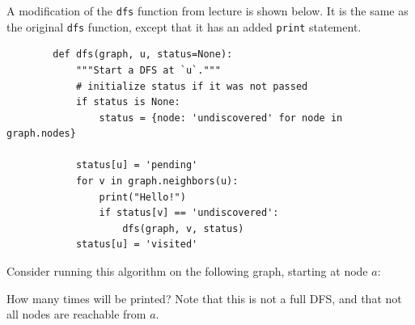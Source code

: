 \Needspace{6.5in}

\begin{prob}

    A modification of the \texttt{dfs} function from lecture is shown below.
    It is the same as the original \texttt{dfs} function, except that it has
    an added \texttt{print} statement.

    \begin{verbatim}
        def dfs(graph, u, status=None):
            """Start a DFS at `u`."""
            # initialize status if it was not passed
            if status is None:
                status = {node: 'undiscovered' for node in graph.nodes}

            status[u] = 'pending'
            for v in graph.neighbors(u):
                print("Hello!")
                if status[v] == 'undiscovered':
                    dfs(graph, v, status)
            status[u] = 'visited'
    \end{verbatim}

    Consider running this algorithm on the following graph, starting at node $a$:

    \begin{center} 
        \graphb{}
    \end{center}

    How many times will  be printed? Note that this is not a full DFS, and
    that not all nodes are reachable from $a$.


\end{prob}
